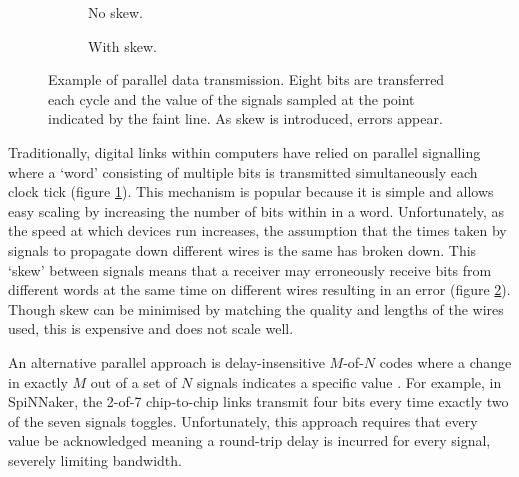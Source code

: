 		\begin{figure}
			\begin{subfigure}{0.48\textwidth}
				\center
				\begin{tikzpicture}[thick, node distance=0.2cm, xscale=0.40]
					
					
					
				\end{tikzpicture}
				
				\caption{No skew.}
				\label{fig:parcons-no-skew}
			\end{subfigure}
			\begin{subfigure}{0.48\textwidth}
				\center
				\begin{tikzpicture}[thick, node distance=0.2cm, xscale=0.40]
					
					
				\end{tikzpicture}
				
				\caption{With skew.}
				\label{fig:parcons-with-skew}
			\end{subfigure}
			
			\caption[Parallel signalling example.]{Example of parallel data
			transmission. Eight bits are transferred each cycle and the value of the
			signals sampled at the point indicated by the faint line. As skew is
			introduced, errors appear.}
			\label{fig:parcons} \end{figure}
		
		Traditionally, digital links within computers have relied on parallel
		signalling where a `word' consisting of multiple bits is transmitted
		simultaneously each clock tick (figure \ref{fig:parcons-no-skew}). This
		mechanism is popular because it is simple and allows easy scaling by
		increasing the number of bits within in a word. Unfortunately, as the speed
		at which devices run increases, the assumption that the times taken by
		signals to propagate down different wires is the same has broken down. This
		`skew' between signals means that a receiver may erroneously receive bits
		from different words at the same time on different wires resulting in an
		error (figure \ref{fig:parcons-with-skew}). Though skew can be minimised by
		matching the quality and lengths of the wires used, this is expensive and
		does not scale well.
		
		An alternative parallel approach is delay-insensitive $M$-of-$N$ codes where
		a change in exactly $M$ out of a set of $N$ signals indicates a specific
		value \cite{bainbridge03}. For example, in SpiNNaker, the 2-of-7
		chip-to-chip links transmit four bits every time exactly two of the seven
		signals toggles.  Unfortunately, this approach requires that every value be
		acknowledged meaning a round-trip delay is incurred for every signal,
		severely limiting bandwidth.
		
